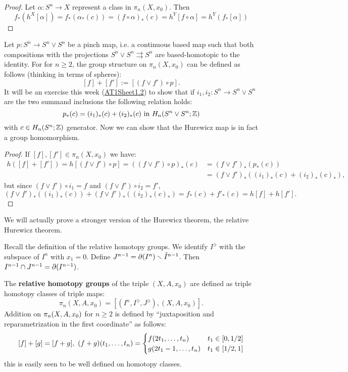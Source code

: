 \begin{proof}
Let $\alpha:S^n\to X$ represent a class in $\pi_n(X,x_0)$. Then
\[f_*(h^X[\alpha])=f_*(\alpha_*(c))=(f\circ\alpha)_*(c)=h^Y[f\circ\alpha]=h^Y(f_*[\alpha])\]
\end{proof}

\label{paragraph:hurewicz-morphism} Let $p:S^n\to S^n\vee S^n$ be a pinch map, i.e. a continuous based map such that both compositions with the projections $S^n\vee S^n\rightrightarrows S^n$ are based-homotopic to the identity. For for $n\geq2$, the group structure on $\pi_n(X,x_0)$ can be defined as follows (thinking in terms of spheres):
\[[f]+[f']:=[(f\vee f')\circ p].\]
It will be an exercise this week (\hyperref[exercise:AT1Sheet1.2]{AT1Sheet1.2}) to show that if $i_1,i_2:S^n\to S^n\vee S^n$ are the two summand inclusions the following relation holds:
\[p_*(c)=(i_1)_*(c)+(i_2)_*(c) \text{ in } H_n(S^n\vee S^n;{\mathbb Z})\]
with $c\in H_n(S^n;{\mathbb Z})$ generator.
Now we can show that the Hurewicz map is in fact a group homomorphism.
\begin{proof}
If $[f],[f']\in\pi_n(X,x_0)$ we have:
\begin{align*}
    h([f]+[f'])=h[(f\vee f')\circ p]=((f\vee f')\circ p)_*(c)&=(f\vee f')_*(p_*(c))\\
    &=(f\vee f')_*((i_1)_*(c)+(i_2)_*(c)_*),
\end{align*}
but since $(f\vee f')\circ i_1=f$ and $(f\vee f')\circ i_2=f'$,
\[(f\vee f')_*((i_1)_*(c))+(f\vee f')_*((i_2)_*(c)_*)=f_*(c)+f'_*(c)=h[f]+h[f'].\]
\end{proof}

We will actually prove a stronger version of the Hurewicz theorem, the relative Hurewicz theorem.

Recall the definition of the relative homotopy groups. We identify $I^\ni$ with the subspace of $I^n$ with $x_1=0$. Define $J^{n-1}=\partial (I^n)\smallsetminus\mathring{I}^{n-1}$. Then $I^{n-1}\cap J^{n-1}=\partial(I^{n-1})$.

The \textbf{relative homotopy groups} of the triple $(X,A,x_0)$ are defined as triple homotopy classes of triple maps:
\[\pi_n(X,A,x_0)=[(I^n, I^\ni, J^\ni),(X,A,x_0)].\]
Addition on $\pi_n(X,A,x_0)$ for $n\geq 2$ is defined by \enquote{juxtaposition and reparametrization in the first coordinate} as follows:
\[[f]+[g]=[f+g],\ (f+g)(\nn{t}{n})=\begin{cases}f(2t_1,\dots,t_n) & t_1\in[0,1/2] \\ g(2t_1-1,\dots,t_n) & t_1\in[1/2,1]\end{cases}\]
this is easily seen to be well defined on homotopy classes.


